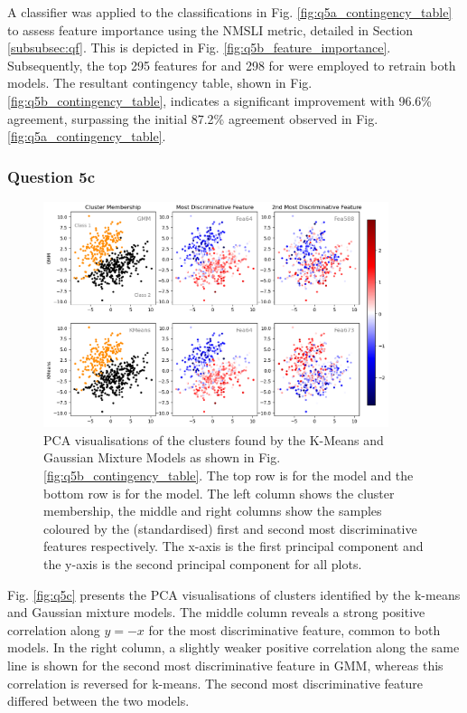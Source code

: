     A  classifier was applied to the classifications in Fig. \eqref{fig:q5a_contingency_table} to
    assess feature importance using the NMSLI metric, detailed in Section \eqref{subsubsec:qf}.
    This is depicted in Fig. \eqref{fig:q5b_feature_importance}.
    Subsequently, the top 295 features for  and 298 for  were employed to
    retrain both models.
    The resultant contingency table, shown in Fig. \eqref{fig:q5b_contingency_table}, indicates a significant improvement
    with 96.6\% agreement, surpassing the initial 87.2\% agreement observed in Fig. \eqref{fig:q5a_contingency_table}.

\subsubsection{Question 5c}\label{subsubsec:q5c}
    \begin{figure}[htb]
    \centering
    \includegraphics[width=0.9\textwidth]{./figures/q5c}
    \caption{PCA visualisations of the clusters found by the K-Means and Gaussian Mixture Models as shown in Fig.
        \eqref{fig:q5b_contingency_table}. The top row is for the  model and the bottom row is for the  model.
        The left column shows the cluster membership, the middle and right columns show the samples coloured by the
        (standardised) first and second most discriminative features respectively. The x-axis is the first principal
        component and the y-axis is the second principal component for all plots.}
    \label{fig:q5c}
    \end{figure}

    Fig. \eqref{fig:q5c} presents the PCA visualisations of clusters identified by the k-means and Gaussian mixture models.
    The middle column reveals a strong positive correlation along $y=-x$ for the most discriminative feature, common to
    both models.
    In the right column, a slightly weaker positive correlation along the same line is shown for the second most
    discriminative feature in GMM, whereas this correlation is reversed for k-means.
    The second most discriminative feature differed between the two models.
